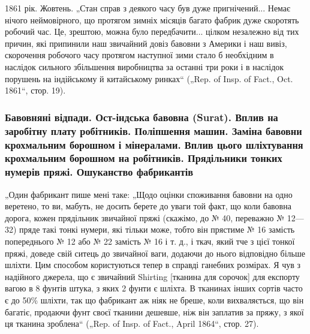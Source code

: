 
1861 рік. Жовтень. „Стан справ з деякого часу був дуже
пригнічений... Немає нічого неймовірного, що протягом зимніх
місяців багато фабрик дуже скоротять робочий час. Це, зрештою,
можна було передбачити... цілком незалежно від тих причин,
які припинили наш звичайний довіз бавовни з Америки і наш вивіз,
скорочення робочого часу протягом наступної зими стало б
необхідним в наслідок сильного збільшення виробництва за
останні три роки і в наслідок порушень на індійському й китайському
ринках“ („Rep. of Insp. of Fact., Oct. 1861“, стор. 19).

\subsubsection{Бавовняні відпади. Ост-індська бавовна (Surat). Вплив на заробітну плату
робітників. Поліпшення машин. Заміна бавовни крохмальним борошном і
мінералами. Вплив цього шліхтування крохмальним борошном на робітників.
Прядільники тонких нумерів пряжі. Ошуканство фабрикантів}

„Один фабрикант пише мені таке: „Щодо оцінки споживання
бавовни на одно веретено, то ви, мабуть, не досить берете до
уваги той факт, що коли бавовна дорога, кожен прядільник
звичайної пряжі (скажімо, до № 40, переважно № 12—32) пряде
такі тонкі нумери, які тільки може, тобто він прястиме № 16
замість попереднього № 12 або № 22 замість № 16 і т. д.,
і ткач, який тче з цієї тонкої пряжі, доведе свій ситець до
звичайної ваги, додаючи до нього відповідно більше шліхти.
Цим способом користуються тепер в справді ганебних розмірах.
Я чув з надійного джерела, що є звичайний Shirting [тканина
для сорочок] для експорту вагою в 8 фунтів штука, з яких
2  фунти є шліхта. В тканинах інших сортів часто є до 50\%
шліхти, так що фабрикант аж ніяк не бреше, коли вихваляється,
що він багатіє, продаючи фунт своєї тканини дешевше, ніж він
заплатив за пряжу, з якої ця тканина зроблена“ („Rep. of Insp.
of Fact., April 1864“, стор. 27).

